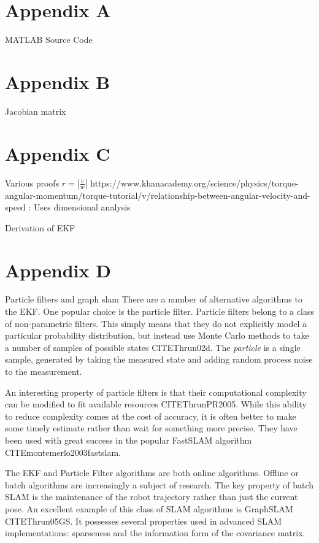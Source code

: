 \documentclass[12pt]{report}
\begin{document}
\chapter{Appendix A}
MATLAB Source Code

\chapter{Appendix B}
Jacobian matrix

\chapter{Appendix C}
Various proofs
$r = |\frac{v}{w}|$
 https://www.khanacademy.org/science/physics/torque-angular-momentum/torque-tutorial/v/relationship-between-angular-velocity-and-speed 
: Uses dimensional analysis

Derivation of EKF

\chapter{Appendix D}
Particle filters and graph slam
There are a number of alternative algorithms to the EKF.  One popular choice is the particle filter.  Particle filters belong to a class of non-parametric filters.  This simply means that they do not explicitly model a particular probability distribution, but instead use Monte Carlo methods to take a number of samples of possible states CITE{Thrun02d}.   The \emph{particle} is a single sample, generated by taking the measured state and adding random process noise to the measurement.  

An interesting property of particle filters is that their computational complexity can be modified to fit available resources CITE{ThrunPR2005}.  While this ability to reduce complexity comes at the cost of accuracy, it is often better to make some timely estimate rather than wait for something more precise.  They have been used with great success in the popular FastSLAM algorithm CITE{montemerlo2003fastslam}.

The EKF and Particle Filter algorithms are both online algorithms.  Offline or batch algorithms are increasingly a subject of research.  The key property of batch SLAM is the maintenance of the robot trajectory rather than just the current pose.   An excellent example of this class of SLAM algorithms is GraphSLAM CITE{Thrun05GS}.  It possesses several properties used in advanced SLAM implementations: sparseness and the information form of the covariance matrix.
\end{document}
